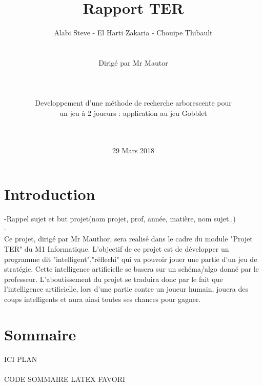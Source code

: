 \documentclass[a4]{article}
\begin{document}
	\title{\Huge{\textbf{Rapport TER}}}
	\author{Alabi Steve - El Harti Zakaria - Chouipe Thibault \\ \\ \\ 
		Dirigé par Mr Mautor \\ \\ \\ \\
		Developpement d’une méthode de recherche arborescente pour \\ un jeu à 2 joueurs : application au 
jeu Gobblet	\\ \\ \\}
	\date{29 Mars 2018}
		

	\begin{titlepage}
		\maketitle
		\vspace{20em}
	\end{titlepage}
	
	\section{Introduction}
	
	-Rappel sujet et but projet(nom projet, prof, année, matière, nom sujet..) \\
	- \\
	
	Ce projet, dirigé par Mr Mauthor, sera realisé dans le cadre du module "Projet TER" du M1 Informatique.
	L'objectif de ce projet est de développer un programme dit "intelligent","réflechi" qui va pouvoir jouer 
	une partie d'un jeu de stratégie. Cette intelligence artificielle se basera sur un schéma/algo donné par
	le professeur.
	L'aboutissement du projet se traduira donc par le fait que l'intelligence artificielle, lors d'une partie
	contre un joueur humain, jouera des coups intelligents et aura ainsi toutes ses chances pour gagner.
	
	
	
	\section{Sommaire}
	
	ICI PLAN \\ \\ CODE SOMMAIRE LATEX FAVORI
	
\end{document}
